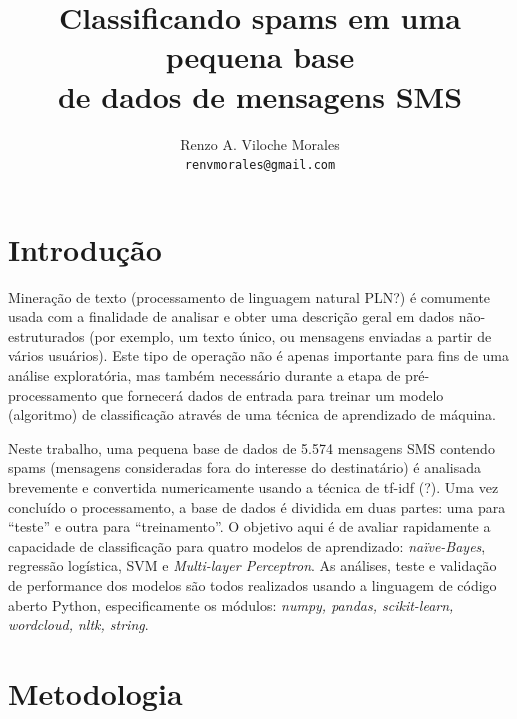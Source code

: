 \documentclass[a4paper,11pt]{article}
\title{ Classificando spams em uma pequena base \\ de dados de mensagens SMS}
\author{Renzo A. Viloche Morales \\ \texttt{renvmorales@gmail.com}}
\begin{document}
\maketitle

\section{Introdução}

Mineração de texto (processamento de linguagem natural PLN?) é comumente usada com a finalidade de analisar e obter uma descrição geral em 
dados não-estruturados (por exemplo, um texto único, ou mensagens enviadas a partir de vários 
usuários). Este tipo de operação não é apenas importante para fins de uma análise exploratória, 
mas também necessário durante a etapa de pré-processamento que fornecerá dados de entrada para 
treinar um modelo (algoritmo) de classificação através de uma técnica de aprendizado de máquina. 

Neste trabalho, uma pequena base de dados de 5.574 mensagens SMS contendo spams (mensagens 
consideradas fora do interesse do destinatário) é analisada brevemente e convertida numericamente 
usando a técnica de tf-idf (?). Uma vez concluído o processamento, a base de dados é dividida 
em duas partes: uma para ``teste'' e outra para ``treinamento''. O objetivo aqui é de avaliar 
rapidamente a capacidade de classificação para quatro modelos de aprendizado: \textit{naïve-Bayes},
regressão logística, SVM e \textit{Multi-layer Perceptron}. As análises, teste e validação de 
performance dos modelos são todos realizados usando a linguagem de código aberto Python, 
especificamente os módulos: \textit{numpy, pandas, scikit-learn, wordcloud, nltk, string}.





\section{Metodologia}
\end{document}

